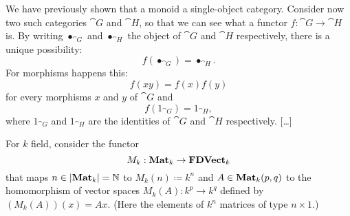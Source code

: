 \begin{example}
We have previously shown that a monoid  a single-object category. Consider now two such categories \(\cat G\) and \(\cat H\), so that we can see what a functor \(f : \cat G \to \cat H\) is. By writing \(\bullet_{\cat G}\) and \(\bullet_{\cat H}\) the object of \(\cat G\) and \(\cat H\) respectively, there is a unique possibility:
\begin{equation}
f(\bullet_{\cat G}) = \bullet_{\cat H} .\label{eqn:MonHomProp0}
\end{equation}
For morphisms happens this:
\begin{equation}
f(xy) = f(x)f(y) \label{eqn:MonHomProp1}
\end{equation}
for every morphisms \(x\) and \(y\) of \(\cat G\) and
\begin{equation}
f(1_{\cat G}) = 1_{\cat H} ,\label{eqn:MonHomProp1}
\end{equation}
where \(1_{\cat G}\) and \(1_{\cat H}\) are the identities of \(\cat G\) and \(\cat H\) respectively. [\dots{}] 
\end{example}

\begin{example}
\end{example}

\begin{example}
For \(k\) field, consider the functor
\[M_k : \mathbf{Mat}_k \to \mathbf{FDVect}_k\]
that maps \(n \in \left\lvert\mathbf{Mat}_k\right\rvert = \mathbb{N}\) to \(M_k(n) \coloneq k^n\) and \(A \in \mathbf{Mat}_k(p, q)\) to the homomorphism of vector spaces \(M_k(A) : k^p \to k^q\) defined by \((M_k(A))(x) = Ax\). (Here the elements of \(k^n\)  matrices of type \(n \times 1\).)
\end{example}
